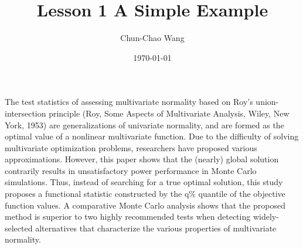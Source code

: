 \documentclass[12pt, a4paper]{article}
\title{ Lesson 1 A Simple Example}
\author{Chun-Chao Wang}
\date{\today }
\begin{document}
\maketitle
\fontsize{12}{22pt}\selectfont 	%

The test statistics of assessing multivariate normality based on Roy's union-intersection principle (Roy, Some Aspects of Multivariate Analysis, Wiley, New York, 1953) are generalizations of univariate normality, and are formed as the optimal value of a nonlinear multivariate function. Due to the difficulty of solving multivariate optimization problems, researchers have proposed various approximations. However, this paper shows that the (nearly) global solution contrarily results in unsatisfactory power performance
in Monte Carlo simulations. Thus, instead of searching for a true optimal solution, this study proposes a functional
statistic constructed by the q\% quantile of the objective function values. A comparative Monte Carlo analysis shows that the proposed method is superior to two highly recommended tests when detecting widely-selected alternatives that characterize the various properties of multivariate normality.
\end{document}
